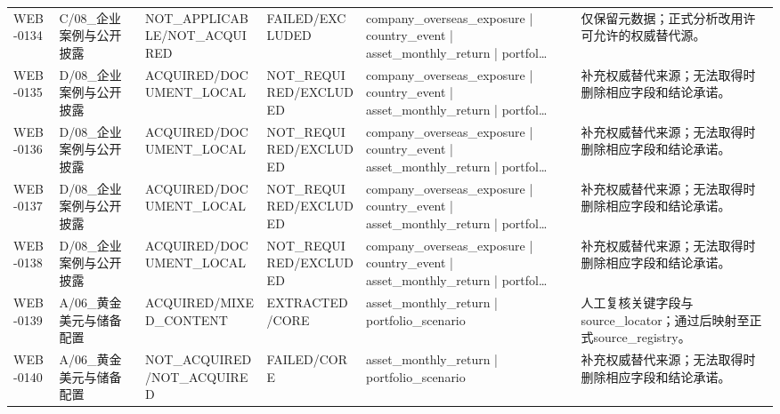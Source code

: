 \begin{landscape}
\begin{longtable}{p{1.8cm}p{2.6cm}p{2.6cm}p{2.6cm}p{4.8cm}p{7.2cm}}
WEB-0134 & C/\allowbreak{}08\_\allowbreak{}企业案例与公开披露 & NOT\_\allowbreak{}APPLICABLE/\allowbreak{}NOT\_\allowbreak{}ACQUIRED & FAILED/\allowbreak{}EXCLUDED & company\_\allowbreak{}overseas\_\allowbreak{}exposure | country\_\allowbreak{}event | asset\_\allowbreak{}monthly\_\allowbreak{}return | portfol… & 仅保留元数据；正式分析改用许可允许的权威替代源。\\
WEB-0135 & D/\allowbreak{}08\_\allowbreak{}企业案例与公开披露 & ACQUIRED/\allowbreak{}DOCUMENT\_\allowbreak{}LOCAL & NOT\_\allowbreak{}REQUIRED/\allowbreak{}EXCLUDED & company\_\allowbreak{}overseas\_\allowbreak{}exposure | country\_\allowbreak{}event | asset\_\allowbreak{}monthly\_\allowbreak{}return | portfol… & 补充权威替代来源；无法取得时删除相应字段和结论承诺。\\
WEB-0136 & D/\allowbreak{}08\_\allowbreak{}企业案例与公开披露 & ACQUIRED/\allowbreak{}DOCUMENT\_\allowbreak{}LOCAL & NOT\_\allowbreak{}REQUIRED/\allowbreak{}EXCLUDED & company\_\allowbreak{}overseas\_\allowbreak{}exposure | country\_\allowbreak{}event | asset\_\allowbreak{}monthly\_\allowbreak{}return | portfol… & 补充权威替代来源；无法取得时删除相应字段和结论承诺。\\
WEB-0137 & D/\allowbreak{}08\_\allowbreak{}企业案例与公开披露 & ACQUIRED/\allowbreak{}DOCUMENT\_\allowbreak{}LOCAL & NOT\_\allowbreak{}REQUIRED/\allowbreak{}EXCLUDED & company\_\allowbreak{}overseas\_\allowbreak{}exposure | country\_\allowbreak{}event | asset\_\allowbreak{}monthly\_\allowbreak{}return | portfol… & 补充权威替代来源；无法取得时删除相应字段和结论承诺。\\
WEB-0138 & D/\allowbreak{}08\_\allowbreak{}企业案例与公开披露 & ACQUIRED/\allowbreak{}DOCUMENT\_\allowbreak{}LOCAL & NOT\_\allowbreak{}REQUIRED/\allowbreak{}EXCLUDED & company\_\allowbreak{}overseas\_\allowbreak{}exposure | country\_\allowbreak{}event | asset\_\allowbreak{}monthly\_\allowbreak{}return | portfol… & 补充权威替代来源；无法取得时删除相应字段和结论承诺。\\
WEB-0139 & A/\allowbreak{}06\_\allowbreak{}黄金美元与储备配置 & ACQUIRED/\allowbreak{}MIXED\_\allowbreak{}CONTENT & EXTRACTED/\allowbreak{}CORE & asset\_\allowbreak{}monthly\_\allowbreak{}return | portfolio\_\allowbreak{}scenario & 人工复核关键字段与source\_\allowbreak{}locator；通过后映射至正式source\_\allowbreak{}registry。\\
WEB-0140 & A/\allowbreak{}06\_\allowbreak{}黄金美元与储备配置 & NOT\_\allowbreak{}ACQUIRED/\allowbreak{}NOT\_\allowbreak{}ACQUIRED & FAILED/\allowbreak{}CORE & asset\_\allowbreak{}monthly\_\allowbreak{}return | portfolio\_\allowbreak{}scenario & 补充权威替代来源；无法取得时删除相应字段和结论承诺。\\

\end{longtable}
\end{landscape}

